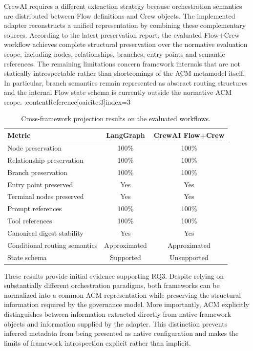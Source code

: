 \documentclass[10pt]{article}
\begin{document}
CrewAI requires a different extraction strategy because orchestration semantics are distributed between Flow definitions and Crew objects. The implemented adapter reconstructs a unified representation by combining these complementary sources. According to the latest preservation report, the evaluated Flow+Crew workflow achieves complete structural preservation over the normative evaluation scope, including nodes, relationships, branches, entry points and semantic references. The remaining limitations concern framework internals that are not statically introspectable rather than shortcomings of the ACM metamodel itself. In particular, branch semantics remain represented as abstract routing structures and the internal Flow state schema is currently outside the normative ACM scope. :contentReference[oaicite:3]{index=3}

\begin{table}[t]
\centering
\caption{Cross-framework projection results on the evaluated workflows.}
\label{tab:projection_results}
\begin{tabular}{lcc}
\toprule
Metric &
LangGraph &
CrewAI Flow+Crew \\
\midrule
Node preservation &
100\% &
100\% \\

Relationship preservation &
100\% &
100\% \\

Branch preservation &
100\% &
100\% \\

Entry point preserved &
Yes &
Yes \\

Terminal nodes preserved &
Yes &
Yes \\

Prompt references &
100\% &
100\% \\

Tool references &
100\% &
100\% \\

Canonical digest stability &
Yes &
Yes \\

Conditional routing semantics &
Approximated &
Approximated \\

State schema &
Supported &
Unsupported \\
\bottomrule
\end{tabular}
\end{table}

These results provide initial evidence supporting RQ3. Despite relying on substantially different orchestration paradigms, both frameworks can be normalized into a common ACM representation while preserving the structural information required by the governance model. More importantly, ACM explicitly distinguishes between information extracted directly from native framework objects and information supplied by the adapter. This distinction prevents inferred metadata from being presented as native configuration and makes the limits of framework introspection explicit rather than implicit.
\end{document}
